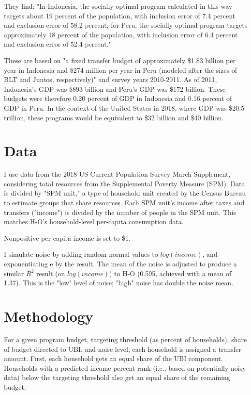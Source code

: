 \documentclass[12pt]{article}
\begin{document}
They find: "In Indonesia, the socially optimal program calculated in this way 
targets about 19 percent of the population, with inclusion error of 7.4 percent 
and exclusion error of 58.2 percent; for Peru, the socially optimal program 
targets approximately 18 percent of the population, with inclusion error of 6.4 
percent and exclusion error of 52.4 percent."

These are based on "a fixed transfer budget of approximately \$1.83 billion per 
year in Indonesia and \$274 million per year in Peru (modeled after the sizes 
of BLT and Juntos, respectively)" and survey years 2010-2011. As of 2011, 
Indonesia's GDP was \$893 billion and Peru's GDP was \$172 billion. These 
budgets were therefore 0.20 percent of GDP in Indonesia and 0.16 percent of GDP 
in Peru. In the context of the United States in 2018, where GDP was \$20.5 
trillion, these programs would be equivalent to \$32 billion and \$40 billion.


\section{Data} \label{sec:data}

I use data from the 2018 US Current Population Survey March Supplement, 
considering total resources from the Supplemental Poverty Measure (SPM). Data 
is divided by "SPM unit," a type of household unit created by the Census Bureau 
to estimate groups that share resources. Each SPM unit's income after taxes and 
transfers ("income") is divided by the number of people in the SPM unit. This 
matches H-O's household-level per-capita consumption data.

Nonpositive per-capita income is set to \$1.

I simulate noise by adding random normal values to $log(income)$, and 
exponentiating e by the result. The mean of the noise is adjusted to produce a 
similar $R^2$ result (on $log(income)$) to H-O (0.595, achieved with a mean of 
1.37). This is the "low" level of noise; "high" noise has double the noise mean.


\section{Methodology} \label{sec:methodology}

For a given program budget, targeting threshold (as percent of households), 
share of budget directed to UBI, and noise level, each household is assigned a 
transfer amount. First, each household gets an equal share of the UBI 
component. Households with a predicted income percent rank (i.e., based on 
potentially noisy data) below the targeting threshold also get an equal share 
of the remaining budget.
\end{document}
